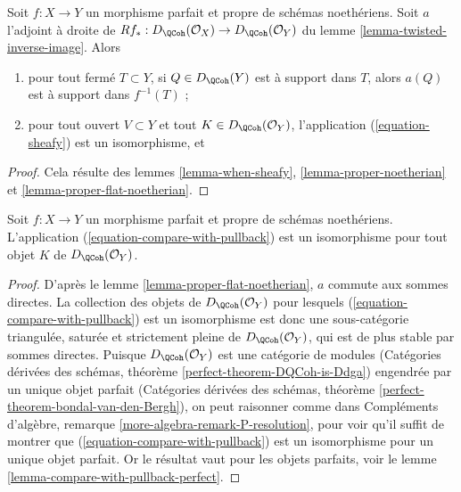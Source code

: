 \begin{lemma}
\label{lemma-proper-flat-noetherian-relative}
Soit $f : X \to Y$ un morphisme parfait et propre de schémas noethériens. Soit $a$ l'adjoint à droite de $Rf_* : D_\QCoh(\mathcal{O}_X) \to D_\QCoh(\mathcal{O}_Y)$ du lemme \ref{lemma-twisted-inverse-image}. Alors
\begin{enumerate}
\item pour tout fermé $T \subset Y$, si $Q \in D_\QCoh(Y)$ est à support dans $T$, alors $a(Q)$ est à support dans $f^{-1}(T)$ ;
\item pour tout ouvert $V \subset Y$ et tout $K \in D_\QCoh(\mathcal{O}_Y)$, l'application (\ref{equation-sheafy}) est un isomorphisme, et
\end{enumerate}
\end{lemma}

\begin{proof}
Cela résulte des lemmes \ref{lemma-when-sheafy}, \ref{lemma-proper-noetherian} et \ref{lemma-proper-flat-noetherian}.
\end{proof}

\begin{lemma}
\label{lemma-compare-with-pullback-flat-proper-noetherian}
Soit $f : X \to Y$ un morphisme parfait et propre de schémas noethériens. L'application (\ref{equation-compare-with-pullback}) est un isomorphisme pour tout objet $K$ de $D_\QCoh(\mathcal{O}_Y)$.
\end{lemma}

\begin{proof}
D'après le lemme \ref{lemma-proper-flat-noetherian}, $a$ commute aux sommes directes. La collection des objets de $D_\QCoh(\mathcal{O}_Y)$ pour lesquels (\ref{equation-compare-with-pullback}) est un isomorphisme est donc une sous-catégorie triangulée, saturée et strictement pleine de $D_\QCoh(\mathcal{O}_Y)$, qui est de plus stable par sommes directes. Puisque $D_\QCoh(\mathcal{O}_Y)$ est une catégorie de modules (Catégories dérivées des schémas, théorème \ref{perfect-theorem-DQCoh-is-Ddga}) engendrée par un unique objet parfait (Catégories dérivées des schémas, théorème \ref{perfect-theorem-bondal-van-den-Bergh}), on peut raisonner comme dans Compléments d'algèbre, remarque \ref{more-algebra-remark-P-resolution}, pour voir qu'il suffit de montrer que (\ref{equation-compare-with-pullback}) est un isomorphisme pour un unique objet parfait. Or le résultat vaut pour les objets parfaits, voir le lemme \ref{lemma-compare-with-pullback-perfect}.
\end{proof}


